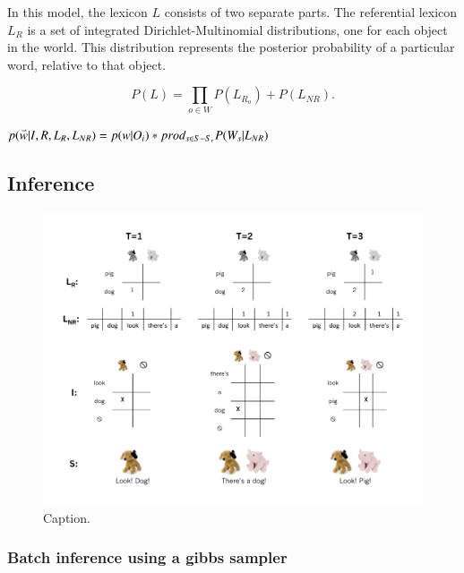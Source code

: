 \documentclass[man,noapacite]{apa2}
\newcommand{\vect}[1]{\accentset{\rightharpoonup}{#1}}
\begin{document}
In this model, the lexicon $L$ consists of two separate parts. The referential lexicon $L_R$ is a set of integrated Dirichlet-Multinomial distributions, one for each object in the world. This distribution represents the posterior probability of a particular word, relative to that object. 

\begin{equation}
P(L) = \prod_{o \in W}{P(L_{R_o})} + P(L_{NR}).
\end{equation}

 



$p(\vect{w} | I, R, L_R, L_{NR}) = p(w|O_i) * prod_{s \in S - S_r} {P(W_s | L_{NR})}$

\subsection{Inference}
\begin{figure}[tr]
\begin{center}
\includegraphics[width=6.5in]{figures/inference_diagram.pdf}
\caption{\label{fig:inference_diagram} Caption.}
\end{center}
\end{figure}

\subsubsection{Batch inference using a gibbs sampler}
\end{document}
